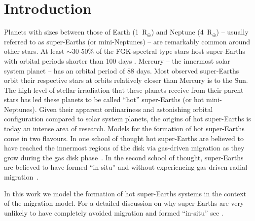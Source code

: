 \documentclass[fleqn,usenatbib]{mnras}
\begin{document}
\section{Introduction}


Planets with sizes between those of Earth (1~R$_{\oplus}$) and Neptune (4~R$_{\oplus}$) -- usually referred to as super-Earths (or mini-Neptunes) -- are remarkably common around other stars. At least $\sim$30-50\% of the FGK-spectral type stars host super-Earths with orbital periods shorter than 100 days \citep{mayoretal11,howard12,fressin2013,marcy2014,muldersetal18}. Mercury -- the innermost solar system planet -- has an orbital period of 88 days. Most observed super-Earths orbit their respective stars at orbits relatively closer than Mercury is to the Sun. The high level of stellar irradiation that these planets receive from their parent stars has led these planets to be called ``hot'' super-Earths (or hot mini-Neptunes). Given their apparent ordinariness and astonishing orbital configuration compared to solar system planets, the origins of hot super-Earths is today an intense area of research. Models for the formation of hot super-Earths come in two flavours. In one school of thought hot super-Earths are believed to have reached the innermost regions of the disk via gas-driven migration as they grow during the gas disk phase~\cite[e.g.][]{terquempapaloizou07,raymond08,idalin098,colemannelson14,cossouetal14,izidoro2017breaking}. In the second school of thought,  super-Earths are believed to have formed  ``in-situ'' and without experiencing gas-driven radial  migration~\citep[e.g][]{raymond08,hansen14,leeetal14,ogiharaetal15}.

In this work we model the formation of hot super-Earths systems in the context of the migration model. For a detailed discussion on why super-Earths are very unlikely to have completely avoided migration and formed  ``in-situ'' see \cite{izidoro2019formation}.
\end{document}
